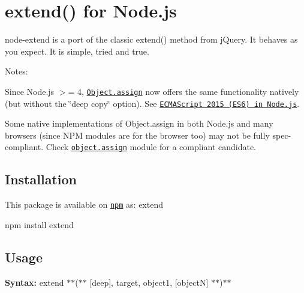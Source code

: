 \href{https://travis-ci.org/justmoon/node-extend}{\tt } \href{https://david-dm.org/justmoon/node-extend}{\tt } \href{https://david-dm.org/justmoon/node-extend#info=devDependencies}{\tt }

\section*{extend() for Node.\+js \textsuperscript{\href{https://npmjs.org/package/extend}{\tt }}}

{\ttfamily node-\/extend} is a port of the classic extend() method from j\+Query. It behaves as you expect. It is simple, tried and true.

Notes\+:


\begin{DoxyItemize}
\item Since Node.\+js $>$= 4, \href{https://developer.mozilla.org/en-US/docs/Web/JavaScript/Reference/Global_Objects/Object/assign}{\tt {\ttfamily Object.\+assign}} now offers the same functionality natively (but without the \char`\"{}deep copy\char`\"{} option). See \href{https://nodejs.org/en/docs/es6}{\tt E\+C\+M\+A\+Script 2015 (E\+S6) in Node.\+js}.
\item Some native implementations of {\ttfamily Object.\+assign} in both Node.\+js and many browsers (since N\+PM modules are for the browser too) may not be fully spec-\/compliant. Check \href{https://www.npmjs.com/package/object.assign}{\tt {\ttfamily object.\+assign}} module for a compliant candidate.
\end{DoxyItemize}

\subsection*{Installation}

This package is available on \href{https://npmjs.org/package/extend}{\tt npm} as\+: {\ttfamily extend}


\begin{DoxyCode}
npm install extend
\end{DoxyCode}


\subsection*{Usage}

{\bfseries Syntax\+:} extend $\ast$$\ast$($\ast$$\ast$ \mbox{[}{\ttfamily deep}\mbox{]}, {\ttfamily target}, {\ttfamily object1}, \mbox{[}{\ttfamily objectN}\mbox{]} $\ast$$\ast$)$\ast$$\ast$

